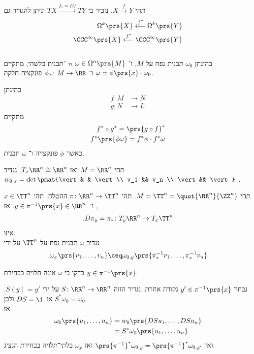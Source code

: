 \documentclass[a4paper,10pt,twoside,openany]{book}
\begin{document}
תהי
$X \xrightarrow{f} Y$,
נזכיר כי
$TX \xrightarrow{f_* = Df} TY$
וניתן להגדיר גם
\begin{align*}
\Omega^k\prs{X} \xleftarrow{f^*} \Omega^k\prs{Y} \\
\CCC^{\infty}\prs{X} \xleftarrow{f^*} \CCC^{\infty}\prs{Y}
\end{align*}
\\
בהינתן
$\omega_0$
תבנית נפח על
$M$,
ו־%
$\omega \in \Omega^n\prs{M}$
$n$%
־תבנית כלשהי, מתקיים
$\omega = \phi\prs{x} \cdot \omega_0$
ו־%
$\phi_x \colon M \to \RR$
פונקציה חלקה.
\\
\begin{exercise}
בהינתן
\begin{align*}
f \colon M &\to N \\
g \colon N &\to L
\end{align*}
מתקיים
\begin{align*}
f^* \circ g^* = \prs{g \circ f}^* \\
f^* \prs{\phi \omega} = f^* \phi \cdot f^* \omega
\end{align*}
כאשר
$\phi$
פונקצייה ו־%
$\omega$
תבנית.
\end{exercise}

\begin{example}
תהי
$M = \RR^n$
ואז
$T_x \RR^n \cong \RR^n$.
נגדיר
$w_{0,x} = \det\pmat{\vert & & \vert \\ v_1 && v_n \\ \vert && \vert}$
.
\end{example}
\begin{example}
תהי
$M = \TT^n = \quot{\RR^n}{\ZZ^n}$.
תהי
$\pi \colon \RR^n \to \TT^n$
ההטלה.
תהי
$x \in \TT^n$,
ו־%
$y \in \pi^{-1}\prs{x} \in \RR^n$.
אז
\begin{align*}
\text{.} D\pi_y = \pi_* \colon T_y \RR^n \to T_x \TT^n
\end{align*}
איזו.
\\
נגדיר
$\omega$
תבנית נפח על
$\TT^n$
על ידי
\[\text{.} \omega_x \prs{v_1, \ldots, v_n} \ceq \omega_{0,y} \prs{\pi_*^{-1} v_1, \ldots, \pi_*^{-1} v_n}\]
\end{example}
\begin{exercise}
בדקו כי
$\omega$
אינה תלויה בבחירת
$y \in \pi^{-1}\prs{x}$.
\end{exercise}
\begin{solution}
נבחר
$y' \in \pi^{-1}\prs{x}$
נקודה אחרת. נגדיר הזזה
$S \colon \RR^n \to \RR^n$
על ידי
$S(y) = y'$.
אז
$DS = \1$
ולכן
$S^* \omega_0 = \omega_0$.\\
אז
\begin{align*}
\omega_0\prs{u_1, \ldots, u_n} &= w_0\prs{DS u_1, \ldots, DS u_n} \\ &= S^* \omega_0 \prs{u_1, \ldots, u_n}
\end{align*}
ואז
$\prs{\pi^{-1}}^* \omega_{0,y} = \prs{\pi^{-1}}^* \omega_{0,y'}$
ואז
$\omega_x$
בלתי־תלויה בבחירת הנציג.
\end{solution}
\end{document}
